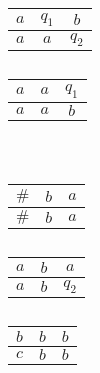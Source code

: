 \documentclass[b5paper, 10pt]{book}
\theoremstyle{definition}
\newenvironment{pf*}{\pushQED{\qed}\pf}{\popQED\endpf}
\begin{document}
\begin{pf*}
\begin{table}[!ht]
        \begin{subtable}[h]{0.3\textwidth}
            \centering
            \begin{tabular}{ | c | c | c|}
            \hline 
            $a$ & $q_1$ & $b$ \\ 
            \hline 
            $a$ & $a$ & $q_2$ \\ 
            \hline
           \end{tabular}
           \caption{}
        \end{subtable}
        \hfill
        \begin{subtable}[h]{0.3\textwidth}
            \centering
            \begin{tabular}{ | c | c | c|}
            \hline 
            $a$ & $a$ & $q_1$ \\ 
            \hline 
            $a$ & $a$ & $b$ \\ 
            \hline
           \end{tabular}
           \caption{}
        \end{subtable}\\
        \begin{subtable}[h]{0.3\textwidth}
            \centering
            \begin{tabular}{ | c | c | c|}
            \hline 
            $\#$ & $b$ & $a$ \\ 
            \hline 
            $\#$ & $b$ & $a$ \\ 
            \hline
           \end{tabular}
           \caption{}
        \end{subtable}
        \hfill
        \begin{subtable}[h]{0.3\textwidth}
            \centering
            \begin{tabular}{ | c | c | c|}
            \hline 
            $a$ & $b$ & $a$ \\ 
            \hline 
            $a$ & $b$ & $q_2$ \\ 
            \hline
           \end{tabular}
           \caption{}
        \end{subtable}
        \hfill
        \begin{subtable}[h]{0.3\textwidth}
            \centering
            \begin{tabular}{ | c | c | c|}
            \hline 
            $b$ & $b$ & $b$ \\ 
            \hline 
            $c$ & $b$ & $b$ \\ 

\end{tabular}
\end{subtable}
\end{table}
\end{pf*}
\end{document}
